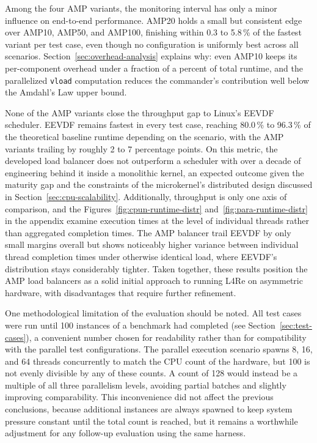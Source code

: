 Among the four AMP variants, the monitoring interval has only a minor influence on end-to-end performance.
AMP20 holds a small but consistent edge over AMP10, AMP50, and AMP100, finishing within 0.3 to 5.8\,\% of the fastest variant per test case, even though no configuration is uniformly best across all scenarios.
Section~\ref{sec:overhead-analysis} explains why: even AMP10 keeps its per-component overhead under a fraction of a percent of total runtime, and the parallelized \texttt{vload} computation reduces the commander's contribution well below the Amdahl's Law upper bound.

None of the AMP variants close the throughput gap to Linux's EEVDF scheduler.
EEVDF remains fastest in every test case, reaching 80.0\,\% to 96.3\,\% of the theoretical baseline runtime depending on the scenario, with the AMP variants trailing by roughly 2 to 7 percentage points.
On this metric, the developed load balancer does not outperform a scheduler with over a decade of engineering behind it inside a monolithic kernel, an expected outcome given the maturity gap and the constraints of the microkernel's distributed design discussed in Section~\ref{sec:cpu-scalability}.
Additionally, throughput is only one axis of comparison, and the Figures~\ref{fig:cpun-runtime-distr} and~\ref{fig:para-runtime-distr} in the appendix examine execution times at the level of individual threads rather than aggregated completion times.
The AMP balancer trail EEVDF by only small margins overall but shows noticeably higher variance between individual thread completion times under otherwise identical load, where EEVDF's distribution stays considerably tighter.
Taken together, these results position the AMP load balancers as a solid initial approach to running L4Re on asymmetric hardware, with disadvantages that require further refinement.

One methodological limitation of the evaluation should be noted.
All test cases were run until 100 instances of a benchmark had completed (see Section~\ref{sec:test-cases}), a convenient number chosen for readability rather than for compatibility with the parallel test configurations.
The parallel execution scenario spawns 8, 16, and 64 threads concurrently to match the CPU count of the hardware, but 100 is not evenly divisible by any of these counts.
A count of 128 would instead be a multiple of all three parallelism levels, avoiding partial batches and slightly improving comparability.
This inconvenience did not affect the previous conclusions, because additional instances are always spawned to keep system pressure constant until the total count is reached, but it remains a worthwhile adjustment for any follow-up evaluation using the same harness.

\cleardoublepage

